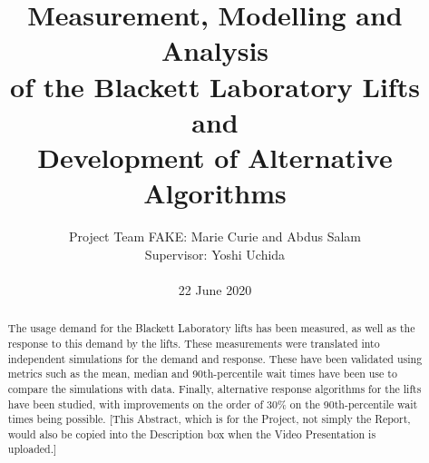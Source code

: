 \documentclass[12pt,a4paper,onecolumn]{Imperial_lab_report}
\begin{document}
\title{Measurement, Modelling and Analysis\\
of the Blackett Laboratory Lifts and\\
Development of Alternative Algorithms}


\author{Project Team FAKE: Marie Curie and Abdus Salam\\
Supervisor: Yoshi Uchida\\
~\\ %
22 June 2020}


\maketitle

\begin{abstract}
The usage demand for the Blackett Laboratory lifts has been measured, as well as the response to this demand by the lifts. These measurements were translated into independent simulations for the demand and response. These have been validated using metrics such as the mean, median and 90th-percentile wait times have been use to compare the simulations with data. Finally, alternative response algorithms for the lifts have been studied, with improvements on the order of 30\% on the 90th-percentile wait times being possible. [This Abstract, which is for the Project, not simply the Report, would also be copied into the Description box when the Video Presentation is uploaded.]
\end{abstract}
\end{document}

